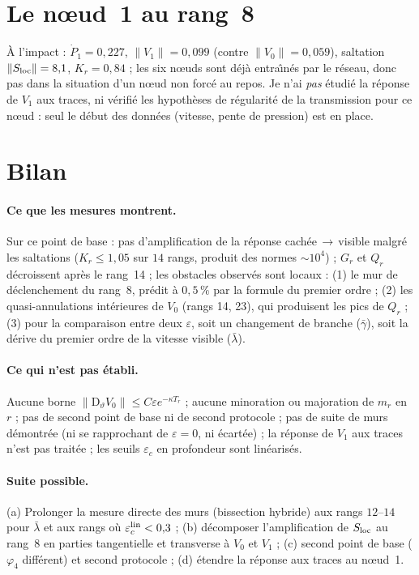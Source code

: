 \documentclass[11pt,a4paper]{article}
\theoremstyle{remark}
\newcommand{\norm}[1]{\lVert #1\rVert}
\newcommand{\vth}{\vartheta}
\newcommand{\D}{\mathrm D}
\begin{document}
\section{Le n\oe ud~1 au rang~8}
\`A l'impact : $\dot P_1=0{,}227$, $\norm{V_1}=0{,}099$ (contre $\norm{V_0}=0{,}059$), saltation $\lVert S_{\rm loc}\rVert=8{,}1$, $K_r=0{,}84$ ; les six n\oe uds sont d\'ej\`a entra\^{\i}n\'es par le r\'eseau, donc pas dans la situation d'un n\oe ud non forc\'e au repos. Je n'ai \emph{pas} \'etudi\'e la r\'eponse de $V_1$ aux traces, ni v\'erifi\'e les hypoth\`eses de r\'egularit\'e de la transmission pour ce n\oe ud : seul le d\'ebut des donn\'ees (vitesse, pente de pression) est en place.

\section{Bilan}
\paragraph{Ce que les mesures montrent.} Sur ce point de base : pas d'amplification de la r\'eponse cach\'ee\,$\to$\,visible malgr\'e les saltations ($K_r\le1{,}05$ sur $14$ rangs, produit des normes $\sim10^4$) ; $G_r$ et $Q_r$ d\'ecroissent apr\`es le rang~14 ; les obstacles observ\'es sont locaux : (1) le mur de d\'eclenchement du rang~8, pr\'edit \`a $0{,}5\,\%$ par la formule du premier ordre ; (2) les quasi-annulations int\'erieures de $V_0$ (rangs 14, 23), qui produisent les pics de $Q_r$ ; (3) pour la comparaison entre deux $\varepsilon$, soit un changement de branche ($\bar\gamma$), soit la d\'erive du premier ordre de la vitesse visible ($\bar\lambda$).

\paragraph{Ce qui n'est pas \'etabli.} Aucune borne $\norm{\D_\vth V_0}\le C\varepsilon e^{-\kappa T_r}$ ; aucune minoration ou majoration de $m_r$ en $r$ ; pas de second point de base ni de second protocole ; pas de suite de murs d\'emontr\'ee (ni se rapprochant de $\varepsilon=0$, ni \'ecart\'ee) ; la r\'eponse de $V_1$ aux traces n'est pas trait\'ee ; les seuils $\varepsilon_c$ en profondeur sont lin\'earis\'es.

\paragraph{Suite possible.} (a) Prolonger la mesure directe des murs (bissection hybride) aux rangs $12$--$14$ pour $\bar\lambda$ et aux rangs o\`u $\varepsilon_c^{\rm lin}<0{,}3$ ; (b) d\'ecomposer l'amplification de $S_{\rm loc}$ au rang~8 en parties tangentielle et transverse \`a $V_0$ et $V_1$ ; (c) second point de base ($\varphi_4$ diff\'erent) et second protocole ; (d) \'etendre la r\'eponse aux traces au n\oe ud~1.
\end{document}

